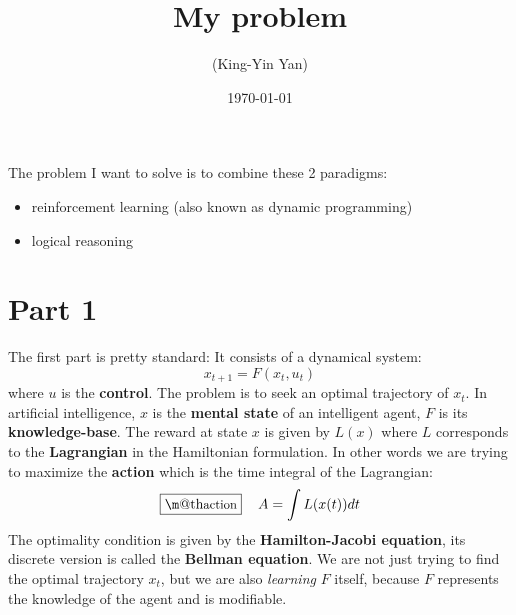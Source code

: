 \documentclass[orivec]{llncs}
\title{My problem}
\author{\usebox{\MyName} (King-Yin Yan)
}
\institute{General.Intelligence@Gmail.com}
\date{\today}
\makeatletter
\renewcommand{\boxed}[1]{\fbox{\m@th$\displaystyle\scalebox{0.9}{#1}$} \,}
\makeatother
\begin{document}
\let\labelitemi\labelitemii

\maketitle

\noindent
\makebox[\linewidth]{\small \today}

\setlength{\parindent}{0em}
\setlength{\parskip}{2.8ex plus0.8ex minus0.8ex}




The problem I want to solve is to combine these 2 paradigms:
\begin{itemize}
	\item  reinforcement learning (also known as dynamic programming)
	\item  logical reasoning
\end{itemize}

\section*{Part 1}

The first part is pretty standard:  It consists of a dynamical system:
\begin{equation}
x_{t + 1} = F(x_t, u_t)
\end{equation}
where $u$ is the \textbf{control}.  The problem is to seek an optimal trajectory of $x_t$.  In artificial intelligence, $x$ is the \textbf{mental state} of an intelligent agent, $F$ is its \textbf{knowledge-base}.  The reward at state $x$ is given by $L(x)$ where $L$ corresponds to the \textbf{Lagrangian} in the Hamiltonian formulation.  In other words we are trying to maximize the \textbf{action} which is the time integral of the Lagrangian:
\begin{equation}
\boxed{action} \quad A = \int L(x(t)) dt
\end{equation}
The optimality condition is given by the \textbf{Hamilton-Jacobi equation}, its discrete version is called the \textbf{Bellman equation}.  We are not just trying to find the optimal trajectory $x_t$, but we are also \textit{learning} $F$ itself, because $F$ represents the knowledge of the agent and is modifiable.
\end{document}
